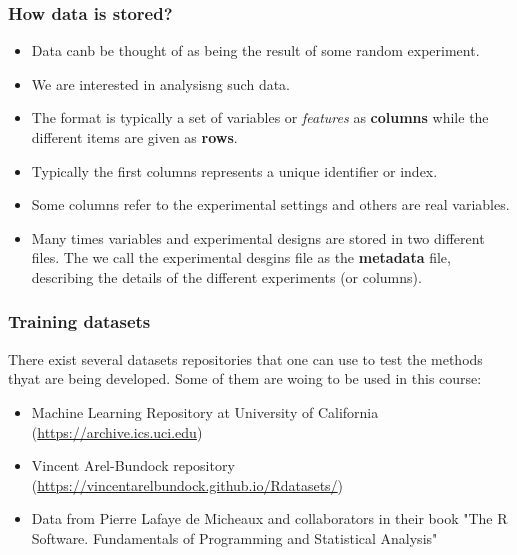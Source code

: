 \documentclass{beamer}
\begin{document}
\begin{frame}
\frametitle{How data is stored?}
\begin{itemize}
  \item Data canb be thought of as being the result of some random experiment.
  \item We are interested in analysisng such data.
  \item The format is typically a set of variables or {\em features} as {\bf columns} while the different items are given as {\bf rows}.
  \item Typically the first columns represents a unique identifier or index.
  \item Some columns refer to the experimental settings and others are real variables.
  \item Many times variables and experimental designs are stored in two different files. The we call the experimental desgins file as the {\bf metadata} file, describing the details of the different experiments (or columns).  
\end{itemize}
\end{frame}


\begin{frame}
\frametitle{Training datasets}
There exist several datasets repositories that one can use to test the methods thyat are being developed. Some of them are woing to be used in this course:
\begin{itemize}
\item Machine Learning Repository at University of California (\url{https://archive.ics.uci.edu})
\item Vincent Arel-Bundock repository (\url{https://vincentarelbundock.github.io/Rdatasets/})
\item Data from Pierre Lafaye de Micheaux and collaborators in their book  "The R Software. Fundamentals of Programming and Statistical Analysis" \cite{lafaye_de_micheaux_r_2013}
\end{itemize}
\end{frame}
\end{document}
